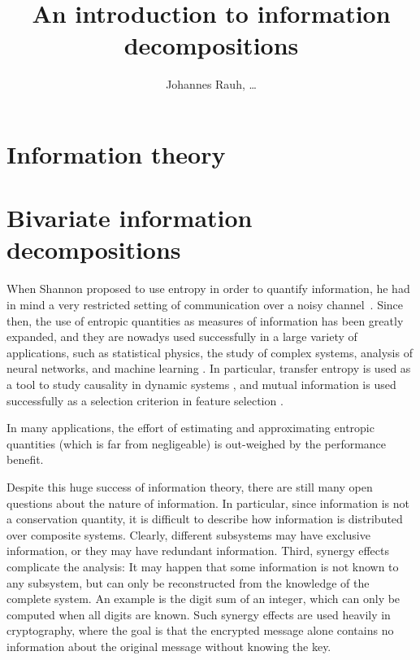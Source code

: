 \documentclass{article}
\title{An introduction to information decompositions}
\author{Johannes Rauh, \dots}
\begin{document}
\maketitle{}

\tableofcontents{}

\section{Information theory}
\label{sec:infotheory}

\section{Bivariate information decompositions}
\label{sec:infodeco}

When Shannon proposed to use entropy in order to quantify information, he had in mind a very restricted setting of
communication over a noisy channel~\cite{Shannon48:A_Mathematical_Theory_of_Communication}.  Since then, the use of entropic quantities as measures of information has been
greatly expanded, and they are nowadys used successfully in a large variety of applications, such as statistical
physics, the study of complex systems, analysis of neural networks, and machine learning \cite{}.
In particular, transfer entropy is used as a tool to study causality in dynamic systems \cite{}, and
mutual information is used successfully as a selection criterion in feature selection \cite{}.

In many applications, the effort of estimating and approximating entropic quantities (which is far from negligeable) is
out-weighed by the performance benefit.

Despite this huge success of information theory, there are still many open questions about the nature of information.
In particular, since information is not a conservation quantity, it is difficult to describe how information is
distributed over composite systems.  Clearly, different subsystems may have exclusive information, or they may have
redundant information.  Third, synergy effects complicate the analysis: It may happen that some information is not known
to any subsystem, but can only be reconstructed from the knowledge of the complete system.  An example is the
digit sum of an integer, which can only be computed when all digits are known.  Such synergy effects are used
heavily in cryptography, where the goal is that the encrypted message alone contains no information about the original
message without knowing the key.
\end{document}
